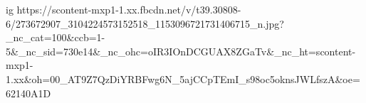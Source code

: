  
 
 
 
 

\ifcmt
  ig https://scontent-mxp1-1.xx.fbcdn.net/v/t39.30808-6/273672907_3104224573152518_1153096721731406715_n.jpg?_nc_cat=100&ccb=1-5&_nc_sid=730e14&_nc_ohc=oIR3IOnDCGUAX8ZGaTv&_nc_ht=scontent-mxp1-1.xx&oh=00_AT9Z7QzDiYRBFwg6N_5ajCCpTEmI_s98oc5oknsJWLfszA&oe=62140A1D
\fi
